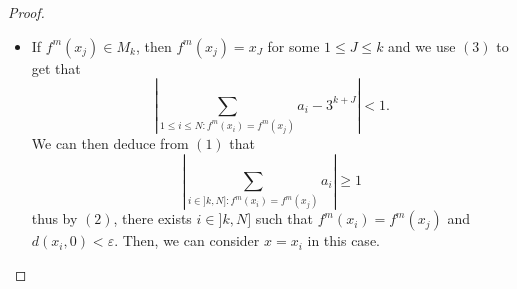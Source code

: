 \documentclass[10pt,a4paper]{amsart}
\begin{document}
\begin{proof}
\begin{itemize}
\item If $f^m(x_j)\in M_k$, then $f^m(x_j)=x_J$ for some $1\le J\le k$ and we use $(3)$ to get that 
\[\left|\sum_{1\leq i\leq N:f^m(x_i)=f^m(x_j)}a_i-3^{k+J}\right|<1.\]
We can then deduce from $(1)$ that
\[\left|\sum_{i\in ]k,N]:f^m(x_i)=f^m(x_j)}a_i\right|\ge 1\]
thus by $(2)$, there exists $i\in ]k,N]$ such that $f^m(x_i)=f^m(x_j)$ and $d(x_i,0)<\varepsilon$. Then, we can consider $x=x_i$ in this case.
\end{itemize}

\end{proof}
\end{document}
